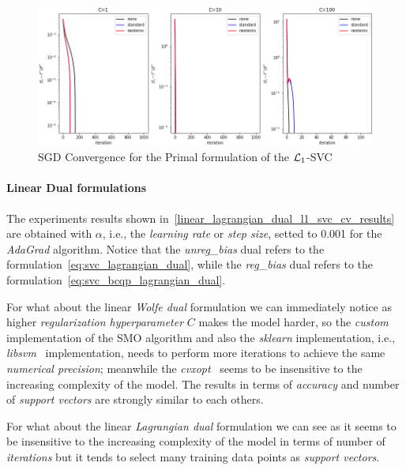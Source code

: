 \begin{figure}[H]
	\centering
	\includegraphics[scale=0.55]{img/l1_svc_loss_history}
	\caption{SGD Convergence for the Primal formulation of the $\protect \mathcal{L}_1$-SVC}
	\label{fig:l1_svc_history}
\end{figure}

\paragraph{Linear Dual formulations}

The experiments results shown in~\ref{linear_lagrangian_dual_l1_svc_cv_results} are obtained with $\alpha$, i.e., the \emph{learning rate} or \emph{step size}, setted to 0.001 for the \emph{AdaGrad} algorithm. Notice that the \emph{unreg\_bias} dual refers to the formulation~\eqref{eq:svc_lagrangian_dual}, while the \emph{reg\_bias} dual refers to the formulation~\eqref{eq:svc_bcqp_lagrangian_dual}.



For what about the linear \emph{Wolfe dual} formulation we can immediately notice as higher \emph{regularization hyperparameter} $C$ makes the model harder, so the \emph{custom} implementation of the SMO algorithm and also the \emph{sklearn} implementation, i.e., \emph{libsvm}~\cite{chang2011libsvm} implementation, needs to perform more iterations to achieve the same \emph{numerical precision}; meanwhile the \emph{cvxopt}~\cite{vandenberghe2010cvxopt} seems to be insensitive to the increasing complexity of the model. The results in terms of \emph{accuracy} and number of \emph{support vectors} are strongly similar to each others.



For what about the linear \emph{Lagrangian dual} formulation we can see as it seems to be insensitive to the increasing complexity of the model in terms of number of \emph{iterations} but it tends to select many training data points as \emph{support vectors}.

